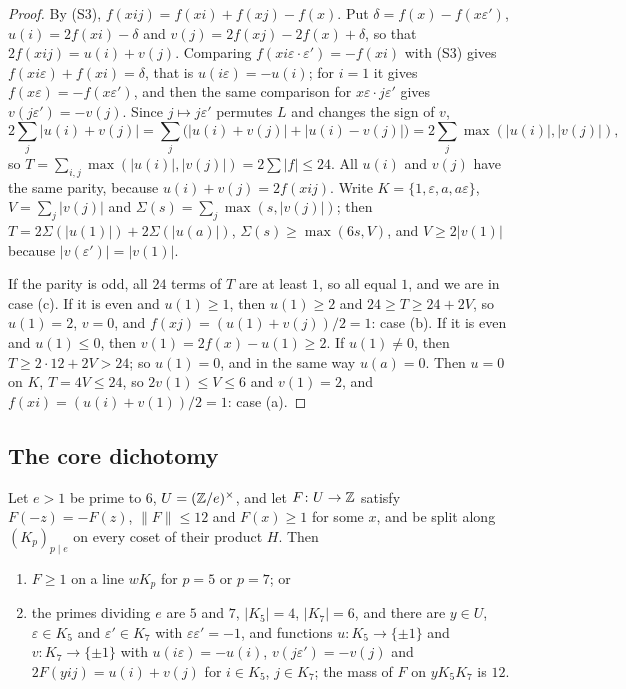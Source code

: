 \begin{proof}
By (S3), $f(xij)=f(xi)+f(xj)-f(x)$. Put $\delta=f(x)-f(x\varepsilon')$,
$u(i)=2f(xi)-\delta$ and $v(j)=2f(xj)-2f(x)+\delta$, so that $2f(xij)=u(i)+
v(j)$. Comparing $f(xi\varepsilon\cdot\varepsilon')=-f(xi)$ with (S3) gives
$f(xi\varepsilon)+f(xi)=\delta$, that is $u(i\varepsilon)=-u(i)$; for $i=1$
it gives $f(x\varepsilon)=-f(x\varepsilon')$, and then the same comparison
for $x\varepsilon\cdot j\varepsilon'$ gives $v(j\varepsilon')=-v(j)$. Since
$j\mapsto j\varepsilon'$ permutes $L$ and changes the sign of $v$,
\[
  2\sum_{j}|u(i)+v(j)|=\sum_{j}\bigl(|u(i)+v(j)|+|u(i)-v(j)|\bigr)
  =2\sum_{j}\max(|u(i)|,|v(j)|),
\]
so $T=\sum_{i,j}\max(|u(i)|,|v(j)|)=2\sum|f|\le24$. All $u(i)$ and $v(j)$
have the same parity, because $u(i)+v(j)=2f(xij)$. Write
$K=\{1,\varepsilon,a,a\varepsilon\}$, $V=\sum_{j}|v(j)|$ and
$\Sigma(s)=\sum_{j}\max(s,|v(j)|)$; then $T=2\Sigma(|u(1)|)+2\Sigma(|u(a)|)$,
$\Sigma(s)\ge\max(6s,V)$, and $V\ge2|v(1)|$ because
$|v(\varepsilon')|=|v(1)|$.

If the parity is odd, all $24$ terms of $T$ are at least $1$, so all equal
$1$, and we are in case (c). If it is even and $u(1)\ge1$, then $u(1)\ge2$
and $24\ge T\ge24+2V$, so $u(1)=2$, $v=0$, and $f(xj)=(u(1)+v(j))/2=1$: case
(b). If it is even and $u(1)\le0$, then $v(1)=2f(x)-u(1)\ge2$. If $u(1)\ne0$,
then $T\ge2\cdot12+2V>24$; so $u(1)=0$, and in the same way $u(a)=0$. Then
$u=0$ on $K$, $T=4V\le24$, so $2v(1)\le V\le6$ and $v(1)=2$, and
$f(xi)=(u(i)+v(1))/2=1$: case (a).
\end{proof}

\subsection{The core dichotomy}

\begin{proposition}\label{prop:core}
Let $e>1$ be prime to $6$, $U=(\mathbb{Z}/e)^{\times}$, and let $F\colon U\to\mathbb{Z}$
satisfy $F(-z)=-F(z)$, $\|F\|\le12$ and $F(x)\ge1$ for some $x$, and be split
along $(K_{p})_{p\mid e}$ on every coset of their product $H$. Then
\begin{enumerate}[label=\textup{(\arabic*)}]
\item $F\ge1$ on a line $wK_{p}$ for $p=5$ or $p=7$; or
\item the primes dividing $e$ are $5$ and $7$, $|K_{5}|=4$, $|K_{7}|=6$, and
there are $y\in U$, $\varepsilon\in K_{5}$ and $\varepsilon'\in K_{7}$ with
$\varepsilon\varepsilon'=-1$, and functions $u\colon K_{5}\to\{\pm1\}$ and
$v\colon K_{7}\to\{\pm1\}$ with $u(i\varepsilon)=-u(i)$,
$v(j\varepsilon')=-v(j)$ and $2F(yij)=u(i)+v(j)$ for $i\in K_{5}$, $j\in
K_{7}$; the mass of $F$ on $yK_{5}K_{7}$ is $12$.
\end{enumerate}
\end{proposition}

